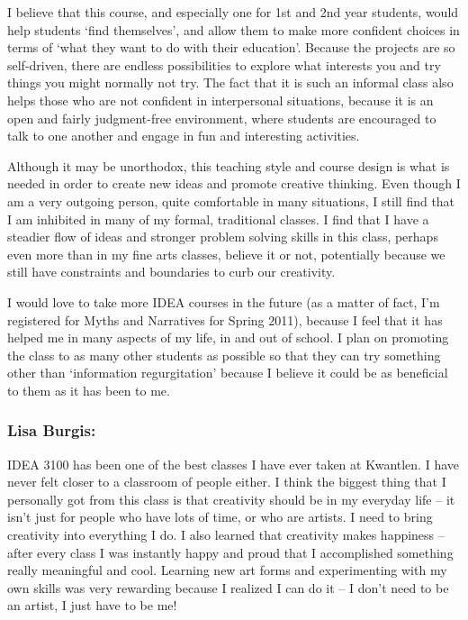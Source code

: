 \documentclass[letterpaper,10pt,headsepline]{scrreprt}
\begin{document}
I believe that this course, and especially one for 1st and 2nd year students, would help students ‘find themselves’, and allow them to make more confident choices in terms of ‘what they want to do with their education’. Because the projects are so self-driven, there are endless possibilities to explore what interests you and try things you might normally not try. The fact that it is such an informal class also helps those who are not confident in interpersonal situations, because it is an open and fairly judgment-free environment, where students are encouraged to talk to one another and engage in fun and interesting activities.

Although it may be unorthodox, this teaching style and course design is what is needed in order to create new ideas and promote creative thinking. Even though I am a very outgoing person, quite comfortable in many situations, I still find that I am inhibited in many of my formal, traditional classes. I find that I have a steadier flow of ideas and stronger problem solving skills in this class, perhaps even more than in my fine arts classes, believe it or not, potentially because we still have constraints and boundaries to curb our creativity.

I would love to take more IDEA courses in the future (as a matter of fact, I’m registered for Myths and Narratives for Spring 2011), because I feel that it has helped me in many aspects of my life, in and out of school. I plan on promoting the class to as many other students as possible so that they can try something other than ‘information regurgitation’ because I believe it could be as beneficial to them as it has been to me.

\subsubsection{Lisa Burgis:}

IDEA 3100 has been one of the best classes I have ever taken at Kwantlen. I have never felt closer to a classroom of people either. I think the biggest thing that I personally got from this class is that creativity should be in my everyday life -- it isn't just for people who have lots of time, or who are artists. I need to bring creativity into everything I do. I also learned that creativity makes happiness -- after every class I was instantly happy and proud that I accomplished something really meaningful and cool. Learning new art forms and experimenting with my own skills was very rewarding because I realized I can do it -- I don't need to be an artist, I just have to be me!
\end{document}
